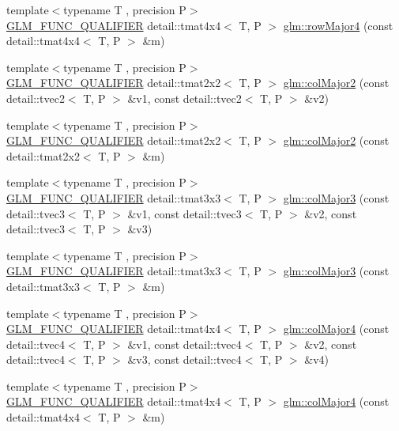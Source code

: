 \begin{DoxyCompactItemize}
\item 
{\footnotesize template$<$typename T , precision P$>$ }\\\hyperlink{setup_8hpp_a33fdea6f91c5f834105f7415e2a64407}{G\+L\+M\+\_\+\+F\+U\+N\+C\+\_\+\+Q\+U\+A\+L\+I\+F\+I\+ER} detail\+::tmat4x4$<$ T, P $>$ \hyperlink{group__gtx__matrix__major__storage_ga1a797d9a3f0d6b81e50b4f1bef2ed281}{glm\+::row\+Major4} (const detail\+::tmat4x4$<$ T, P $>$ \&m)
\item 
{\footnotesize template$<$typename T , precision P$>$ }\\\hyperlink{setup_8hpp_a33fdea6f91c5f834105f7415e2a64407}{G\+L\+M\+\_\+\+F\+U\+N\+C\+\_\+\+Q\+U\+A\+L\+I\+F\+I\+ER} detail\+::tmat2x2$<$ T, P $>$ \hyperlink{group__gtx__matrix__major__storage_gae53863d1ced5629d5aa3ce04abf14ab1}{glm\+::col\+Major2} (const detail\+::tvec2$<$ T, P $>$ \&v1, const detail\+::tvec2$<$ T, P $>$ \&v2)
\item 
{\footnotesize template$<$typename T , precision P$>$ }\\\hyperlink{setup_8hpp_a33fdea6f91c5f834105f7415e2a64407}{G\+L\+M\+\_\+\+F\+U\+N\+C\+\_\+\+Q\+U\+A\+L\+I\+F\+I\+ER} detail\+::tmat2x2$<$ T, P $>$ \hyperlink{group__gtx__matrix__major__storage_ga84d93f2dea8fd341232f0505038d50f6}{glm\+::col\+Major2} (const detail\+::tmat2x2$<$ T, P $>$ \&m)
\item 
{\footnotesize template$<$typename T , precision P$>$ }\\\hyperlink{setup_8hpp_a33fdea6f91c5f834105f7415e2a64407}{G\+L\+M\+\_\+\+F\+U\+N\+C\+\_\+\+Q\+U\+A\+L\+I\+F\+I\+ER} detail\+::tmat3x3$<$ T, P $>$ \hyperlink{group__gtx__matrix__major__storage_ga8bc9dc6fcd7017b7123a151d9f251013}{glm\+::col\+Major3} (const detail\+::tvec3$<$ T, P $>$ \&v1, const detail\+::tvec3$<$ T, P $>$ \&v2, const detail\+::tvec3$<$ T, P $>$ \&v3)
\item 
{\footnotesize template$<$typename T , precision P$>$ }\\\hyperlink{setup_8hpp_a33fdea6f91c5f834105f7415e2a64407}{G\+L\+M\+\_\+\+F\+U\+N\+C\+\_\+\+Q\+U\+A\+L\+I\+F\+I\+ER} detail\+::tmat3x3$<$ T, P $>$ \hyperlink{group__gtx__matrix__major__storage_ga40caccd20b8afb6de68c626efc376927}{glm\+::col\+Major3} (const detail\+::tmat3x3$<$ T, P $>$ \&m)
\item 
{\footnotesize template$<$typename T , precision P$>$ }\\\hyperlink{setup_8hpp_a33fdea6f91c5f834105f7415e2a64407}{G\+L\+M\+\_\+\+F\+U\+N\+C\+\_\+\+Q\+U\+A\+L\+I\+F\+I\+ER} detail\+::tmat4x4$<$ T, P $>$ \hyperlink{group__gtx__matrix__major__storage_ga50e127c56370410d8054be2cdef03503}{glm\+::col\+Major4} (const detail\+::tvec4$<$ T, P $>$ \&v1, const detail\+::tvec4$<$ T, P $>$ \&v2, const detail\+::tvec4$<$ T, P $>$ \&v3, const detail\+::tvec4$<$ T, P $>$ \&v4)
\item 
{\footnotesize template$<$typename T , precision P$>$ }\\\hyperlink{setup_8hpp_a33fdea6f91c5f834105f7415e2a64407}{G\+L\+M\+\_\+\+F\+U\+N\+C\+\_\+\+Q\+U\+A\+L\+I\+F\+I\+ER} detail\+::tmat4x4$<$ T, P $>$ \hyperlink{group__gtx__matrix__major__storage_ga89086c0396205669304be98a8c601b78}{glm\+::col\+Major4} (const detail\+::tmat4x4$<$ T, P $>$ \&m)
\end{DoxyCompactItemize}
